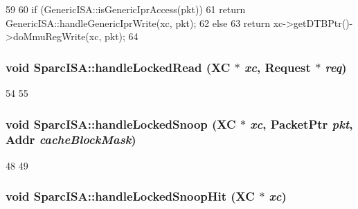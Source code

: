 \begin{DoxyCode}
59 {
60     if (GenericISA::isGenericIprAccess(pkt))
61         return GenericISA::handleGenericIprWrite(xc, pkt);
62     else
63         return xc->getDTBPtr()->doMmuRegWrite(xc, pkt);
64 }
\end{DoxyCode}
\hypertarget{namespaceSparcISA_a1d5d45cf417e886718ca52e167707a6c}{
\subsubsection[{handleLockedRead}]{\setlength{\rightskip}{0pt plus 5cm}void SparcISA::handleLockedRead (XC $\ast$ {\em xc}, \/  {\bf Request} $\ast$ {\em req})}}
\label{namespaceSparcISA_a1d5d45cf417e886718ca52e167707a6c}



\begin{DoxyCode}
54 {
55 }
\end{DoxyCode}
\hypertarget{namespaceSparcISA_a1118bbdd22f21a6b48b9cb896bf5936e}{
\subsubsection[{handleLockedSnoop}]{\setlength{\rightskip}{0pt plus 5cm}void SparcISA::handleLockedSnoop (XC $\ast$ {\em xc}, \/  {\bf PacketPtr} {\em pkt}, \/  {\bf Addr} {\em cacheBlockMask})}}
\label{namespaceSparcISA_a1118bbdd22f21a6b48b9cb896bf5936e}



\begin{DoxyCode}
48 {
49 }
\end{DoxyCode}
\hypertarget{namespaceSparcISA_a814f89ef85d9ebdb602f6b241ea40142}{
\subsubsection[{handleLockedSnoopHit}]{\setlength{\rightskip}{0pt plus 5cm}void SparcISA::handleLockedSnoopHit (XC $\ast$ {\em xc})}}
\label{namespaceSparcISA_a814f89ef85d9ebdb602f6b241ea40142}



